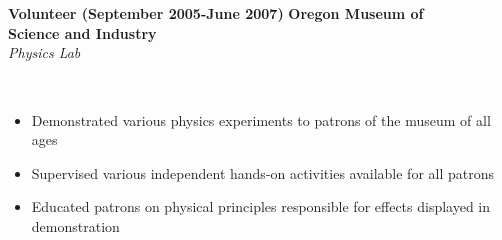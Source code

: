 \documentclass{article}
\begin{document}
\phantom \\
\phantom \\
%
%
%
%
\begin{vwcol}[widths={0.8,0.2}, sep=.8cm, justify=flush, rule=0pt, indent=0em]
\noindent \textbf{Volunteer (September 2005-June 2007)}
\newpage
\noindent \textbf{Oregon Museum of}\\
\noindent \textbf{Science and Industry}\\
\noindent \emph{Physics Lab}
\end{vwcol}
\phantom \\
\begin{itemize}
\item Demonstrated various physics experiments to patrons of the museum of all ages
\item Supervised various independent hands-on activities available for all patrons
\item Educated patrons on physical principles responsible for effects displayed in demonstration
\end{itemize}
\phantom \\
\phantom \\
%
%
%
%
\par
\phantom \\
\phantom \\
\end{document}
